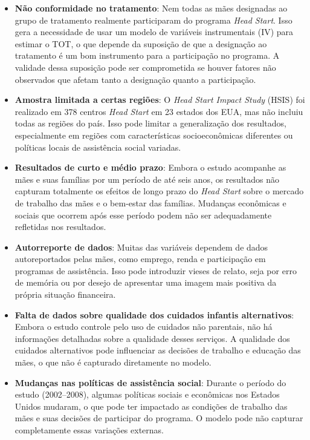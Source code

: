 \documentclass[a4paper,12pt]{article}[abntex2]
\begin{document}
\begin{itemize}
    \item \textbf{Não conformidade no tratamento}: Nem todas as mães designadas ao grupo de tratamento realmente participaram do programa \textit{Head Start}. Isso gera a necessidade de usar um modelo de variáveis instrumentais (IV) para estimar o TOT, o que depende da suposição de que a designação ao tratamento é um bom instrumento para a participação no programa. A validade dessa suposição pode ser comprometida se houver fatores não observados que afetam tanto a designação quanto a participação.
    
    \item \textbf{Amostra limitada a certas regiões}: O \textit{Head Start Impact Study} (HSIS) foi realizado em 378 centros \textit{Head Start} em 23 estados dos EUA, mas não incluiu todas as regiões do país. Isso pode limitar a generalização dos resultados, especialmente em regiões com características socioeconômicas diferentes ou políticas locais de assistência social variadas.
    
    \item \textbf{Resultados de curto e médio prazo}: Embora o estudo acompanhe as mães e suas famílias por um período de até seis anos, os resultados não capturam totalmente os efeitos de longo prazo do \textit{Head Start} sobre o mercado de trabalho das mães e o bem-estar das famílias. Mudanças econômicas e sociais que ocorrem após esse período podem não ser adequadamente refletidas nos resultados.
    
    \item \textbf{Autorreporte de dados}: Muitas das variáveis dependem de dados autoreportados pelas mães, como emprego, renda e participação em programas de assistência. Isso pode introduzir vieses de relato, seja por erro de memória ou por desejo de apresentar uma imagem mais positiva da própria situação financeira.
    
    \item \textbf{Falta de dados sobre qualidade dos cuidados infantis alternativos}: Embora o estudo controle pelo uso de cuidados não parentais, não há informações detalhadas sobre a qualidade desses serviços. A qualidade dos cuidados alternativos pode influenciar as decisões de trabalho e educação das mães, o que não é capturado diretamente no modelo.
    
    \item \textbf{Mudanças nas políticas de assistência social}: Durante o período do estudo (2002–2008), algumas políticas sociais e econômicas nos Estados Unidos mudaram, o que pode ter impactado as condições de trabalho das mães e suas decisões de participar do programa. O modelo pode não capturar completamente essas variações externas.
\end{itemize}
\end{document}

